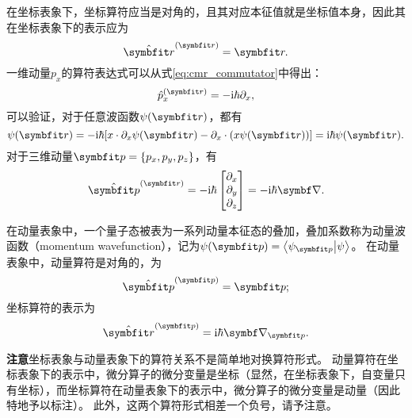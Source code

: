 在坐标表象下，坐标算符应当是对角的，且其对应本征值就是坐标值本身，因此其在坐标表象下的表示应为
\begin{equation}
    \hat{\rr}^{(\rr)} = \rr.
\end{equation}
一维动量$p_x$的算符表达式可以从式\eqref{eq:cmr_commutator}中得出：
\begin{equation}
    \hat{p}_x^{(\rr)} = -\ii\hbar\pd_x,
\end{equation}
可以验证，对于任意波函数$\psi(\rr)$，都有
\begin{equation}
    [x,\hat{p}_x] \psi(\rr) = -\ii\hbar [x\cdot\pd_x\psi(\rr) - \pd_x\cdot (x\psi(\rr))] = \ii\hbar \psi(\rr).
\end{equation}
对于三维动量$\pp=\{p_x,p_y,p_z\}$，有
\begin{equation}
    \hat{\pp}^{(\rr)} = -\ii\hbar
    \begin{bmatrix}
        \pd_x \\ \pd_y \\ \pd_z
    \end{bmatrix}
    = -\ii\hbar\del.
\end{equation}

在动量表象中，一个量子态被表为一系列动量本征态的叠加，叠加系数称为动量波函数（momentum wavefunction），记为$\psi(\pp)=\braket{\psi_{\pp}}{\psi}$。
在动量表象中，动量算符是对角的，为
\begin{equation}
    \hat{\pp}^{(\pp)} = \pp;
\end{equation}
坐标算符的表示为
\begin{equation}
    \hat{\rr}^{(\pp)} = \ii\hbar\del_{\pp}.
\end{equation}

\textbf{注意}\quad 坐标表象与动量表象下的算符关系不是简单地对换算符形式。
动量算符在坐标表象下的表示中，微分算子的微分变量是坐标（显然，在坐标表象下，自变量只有坐标），而坐标算符在动量表象下的表示中，微分算子的微分变量是动量（因此特地予以标注）。
此外，这两个算符形式相差一个负号，请予注意。


